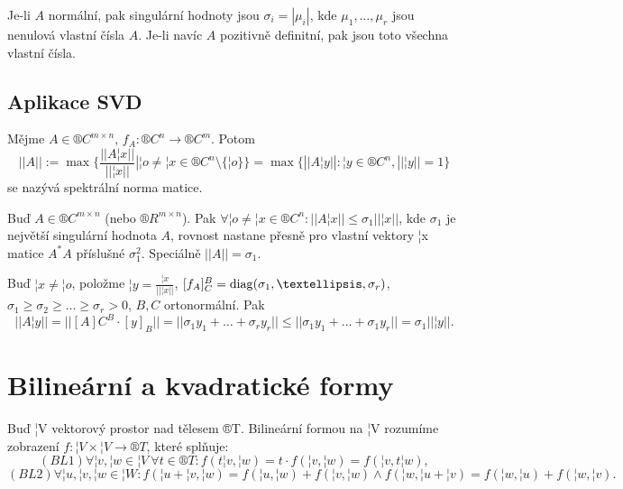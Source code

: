 \documentclass[12pt]{article}                   %
\begin{document}
        \begin{pozorovani}
            Je-li $A$ normální, pak singulární hodnoty jsou $\sigma_i = |\mu_i|$, kde $\mu_1, …, \mu_r$ jsou nenulová vlastní čísla $A$. Je-li navíc $A$ pozitivně definitní, pak jsou toto všechna vlastní čísla.
        \end{pozorovani}

    \subsection{Aplikace SVD}
        \begin{definice}
            Mějme $A \in ®C^{m \times n}$, $f_A: ®C^n \rightarrow ®C^m$. Potom
            $$ ||A|| := \max\{\frac{||A¦x||}{||¦x||} | ¦o ≠ ¦x \in ®C^n \setminus \{¦o\}\} = \max\{||A¦y|| : ¦y \in ®C^n, ||¦y|| = 1\} $$
            se nazývá spektrální norma matice.
        \end{definice}

        \begin{tvrzeni}
            Buď $A \in ®C^{m \times n}$ (nebo $®R^{m \times n}$). Pak $\forall ¦o ≠ ¦x \in ®C^n: ||A¦x|| ≤ \sigma_1||¦x||$, kde $\sigma_1$ je největší singulární hodnota $A$, rovnost nastane přesně pro vlastní vektory ¦x matice $A^*A$ příslušné $\sigma_1^2$. Speciálně $||A|| = \sigma_1$.

            \begin{dukazin}
                Buď $¦x ≠ ¦o$, položme $¦y = \frac{¦x}{||¦x||}$, $[f_A]_C^B = \diag(\sigma_1, …, \sigma_r)$, $\sigma_1 ≥ \sigma_2 ≥ … ≥ \sigma_r > 0$, $B, C$ ortonormální. Pak
                $$ ||A¦y|| = ||[A]C^B·[y]_B|| = ||\sigma_1y_1 + … + \sigma_ry_r|| ≤ ||\sigma_1y_1 + … + \sigma_1y_r|| = \sigma_1||¦y||. $$ 
            \end{dukazin}
        \end{tvrzeni}


\section{Bilineární a kvadratické formy}

    \begin{definice}
        Buď ¦V vektorový prostor nad tělesem ®T. Bilineární formou na ¦V rozumíme zobrazení $f: ¦V \times ¦V \rightarrow ®T$, které splňuje:
        $$ (BL1) \forall ¦v, ¦w \in ¦V\ \forall t \in ®T: f(t¦v, ¦w) = t·f(¦v, ¦w) = f(¦v, t¦w), $$
        $$ (BL2) \forall ¦u, ¦v, ¦w \in ¦W: f(¦u + ¦v, ¦w) = f(¦u, ¦w) + f(¦v, ¦w) \land f(¦w, ¦u + ¦v) = f(¦w, ¦u) + f(¦w, ¦v). $$ 
    \end{definice}
\end{document}
